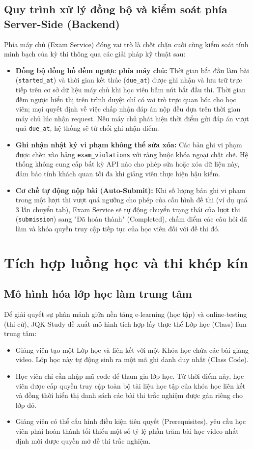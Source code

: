 \documentclass[../DoAn.tex]{subfiles}
\begin{document}
\subsection{Quy trình xử lý đồng bộ và kiểm soát phía Server-Side (Backend)}
Phía máy chủ (Exam Service) đóng vai trò là chốt chặn cuối cùng kiểm soát tính minh bạch của kỳ thi thông qua các giải pháp kỹ thuật sau:
\begin{itemize}
    \item \textbf{Đồng bộ đồng hồ đếm ngược phía máy chủ:} Thời gian bắt đầu làm bài (\texttt{started\_at}) và thời gian kết thúc (\texttt{due\_at}) được ghi nhận và lưu trữ trực tiếp trên cơ sở dữ liệu máy chủ khi học viên bấm nút bắt đầu thi. Thời gian đếm ngược hiển thị trên trình duyệt chỉ có vai trò trực quan hóa cho học viên; mọi quyết định về việc chấp nhận đáp án nộp đều dựa trên thời gian máy chủ lúc nhận request. Nếu máy chủ phát hiện thời điểm gửi đáp án vượt quá \texttt{due\_at}, hệ thống sẽ từ chối ghi nhận điểm.
    \item \textbf{Ghi nhận nhật ký vi phạm không thể sửa xóa:} Các bản ghi vi phạm được chèn vào bảng \texttt{exam\_violations} với ràng buộc khóa ngoại chặt chẽ. Hệ thống không cung cấp bất kỳ API nào cho phép sửa hoặc xóa dữ liệu này, đảm bảo tính khách quan tối đa khi giảng viên thực hiện hậu kiểm.
    \item \textbf{Cơ chế tự động nộp bài (Auto-Submit):} Khi số lượng bản ghi vi phạm trong một lượt thi vượt quá ngưỡng cho phép của cấu hình đề thi (ví dụ quá 3 lần chuyển tab), Exam Service sẽ tự động chuyển trạng thái của lượt thi (\texttt{submission}) sang "Đã hoàn thành" (Completed), chấm điểm các câu hỏi đã làm và khóa quyền truy cập tiếp tục của học viên đối với đề thi đó.
\end{itemize}

\section{Tích hợp luồng học và thi khép kín}
\label{section:5.3}

\subsection{Mô hình hóa lớp học làm trung tâm}
Để giải quyết sự phân mảnh giữa nền tảng e-learning (học tập) và online-testing (thi cử), JQK Study đề xuất mô hình tích hợp lấy thực thể Lớp học (Class) làm trung tâm:
\begin{itemize}
    \item Giảng viên tạo một Lớp học và liên kết với một Khóa học chứa các bài giảng video. Lớp học này tự động sinh ra một mã ghi danh duy nhất (Class Code).
    \item Học viên chỉ cần nhập mã code để tham gia lớp học. Từ thời điểm này, học viên được cấp quyền truy cập toàn bộ tài liệu học tập của khóa học liên kết và đồng thời hiển thị danh sách các bài thi trắc nghiệm được gán riêng cho lớp đó.
    \item Giảng viên có thể cấu hình điều kiện tiên quyết (Prerequisites), yêu cầu học viên phải hoàn thành tối thiểu một số tỷ lệ phần trăm bài học video nhất định mới được quyền mở đề thi trắc nghiệm.
\end{itemize}
\end{document}

